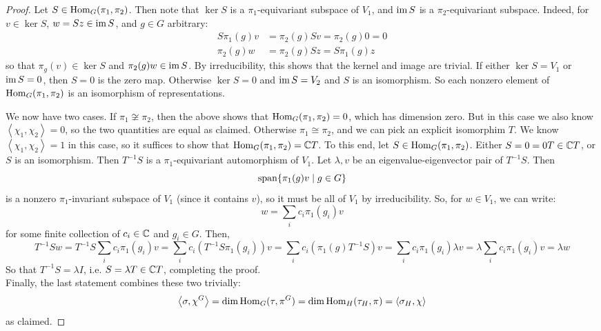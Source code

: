 \begin{proof}
	Let $S \in \operatorname{Hom}_G(\pi_1,\pi_2)$. Then note that $\ker S$ is a $\pi_1$-equivariant subspace of $V_1$, and $\operatorname{im} S$ is a $\pi_2$-equivariant subspace. Indeed, for $v \in \ker S$, $w = Sz \in \operatorname{im} S$, and $g \in G$ arbitrary:
	\begin{align*}
		S\pi_1(g)v &= \pi_2(g)Sv = \pi_2(g)0 = 0 \\
		\pi_2(g)w &= \pi_2(g)Sz = S\pi_1(g)z
	\end{align*}
	so that $\pi_g(v) \in \ker S$ and $\pi_2(g)w \in \operatorname{im} S$. By irreducibility, this shows that the kernel and image are trivial. If either $\ker S = V_1$ or $\operatorname{im} S = 0$, then $S=0$ is the zero map. Otherwise $\ker S = 0$ and $\operatorname{im} S = V_2$ and $S$ is an isomorphism. So each nonzero element of $\operatorname{Hom}_G(\pi_1,\pi_2)$ is an isomorphism of representations.
	
	We now have two cases. If $\pi_1 \not\cong \pi_2$, then the above shows that $\operatorname{Hom}_G(\pi_1,\pi_2) = 0$, which has dimension zero. But in this case we also know $\left<\chi_1,\chi_2\right> = 0$, so the two quantities are equal as claimed. Otherwise $\pi_1 \cong \pi_2$, and we can pick an explicit isomorphim $T$. We know $\left<\chi_1,\chi_2\right> = 1$ in this case, so it suffices to show that $\operatorname{Hom}_G(\pi_1,\pi_2) = \mathbb{C} T$. To this end, let $S \in \operatorname{Hom}_G(\pi_1,\pi_2)$. Either $S=0=0T \in \mathbb{C} T$, or $S$ is an isomorphism. Then $T^{-1}S$ is a $\pi_1$-equivariant automorphism of $V_1$. Let $\lambda,v$ be an eigenvalue-eigenvector pair of $T^{-1}S$. Then
	\[ \operatorname{span} \{ \pi_1(g)v \mid g \in G \} \]
	is a nonzero $\pi_1$-invariant subspace of $V_1$ (since it contains $v$), so it must be all of $V_1$ by irreducibility. So, for $w \in V_1$, we can write:
	\[ w = \sum_i c_i\pi_1(g_i)v \]
	for some finite collection of $c_i \in \mathbb{C}$ and $g_i \in G$. Then,
	\[ T^{-1}Sw = T^{-1}S\sum_i c_i\pi_1(g_i)v = \sum_i c_i(T^{-1}S\pi_1(g_i))v = \sum_i c_i(\pi_1(g)T^{-1}S)v = \sum_i c_i\pi_1(g_i)\lambda v = \lambda \sum_i c_i\pi_1(g_i)v = \lambda w \]
	So that $T^{-1}S = \lambda I$, i.e. $S = \lambda T \in \mathbb{C} T$, completing the proof. \\
	
	Finally, the last statement combines these two trivially:
	\[ \left<\sigma,\chi^G\right> = \dim\operatorname{Hom}_G(\tau,\pi^G) = \dim\operatorname{Hom}_H(\tau_H,\pi) = \left<\sigma_H,\chi\right> \]
	as claimed.
\end{proof}
